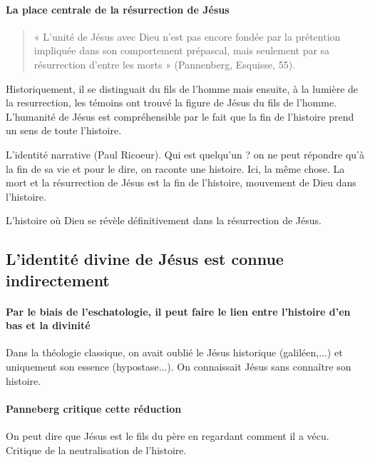 \paragraph{La place centrale de la résurrection de Jésus} 
\begin{quote}
    « L’unité de Jésus avec Dieu n’est pas encore fondée par la prétention impliquée dans son
comportement prépascal, mais seulement par sa résurrection d’entre les morts » (Pannenberg,
Esquisse, 55).
\end{quote}
Historiquement, il se distinguait du fils de l'homme mais ensuite, à la lumière de la resurrection, les témoins ont trouvé la figure de Jésus du fils de l'homme. L'humanité de Jésus est compréhensible par le fait que la fin de l'histoire prend un sens de toute l'histoire.
\begin{Prop}
    L'identité narrative (Paul Ricoeur). Qui est quelqu'un ? on ne peut répondre qu'à la fin de sa vie et pour le dire, on raconte une histoire.
    Ici, la même chose. La mort et la résurrection de Jésus est la fin de l'histoire, mouvement de Dieu dans l'histoire. 
\end{Prop}
L'histoire où Dieu se révèle définitivement dans la résurrection de Jésus. 

\begin{Synthesis}

\end{Synthesis}
\subsection{L’identité divine de Jésus est connue indirectement}

\paragraph{Par le biais de l'eschatologie, il peut faire le lien entre l'histoire d'en bas et la divinité} Dans la théologie classique, on avait oublié le Jésus historique (galiléen,...) et uniquement son essence (hypostase...). On connaissait Jésus sans connaître son histoire. 

\paragraph{Panneberg critique cette réduction} On peut dire que Jésus est le fils du père en regardant comment il a vécu. Critique de la neutralisation de l'histoire. 

